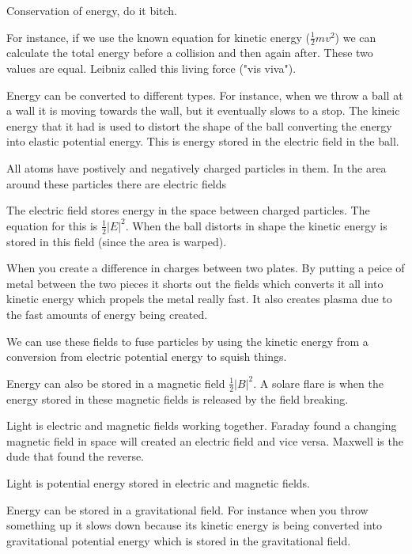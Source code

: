 \documentclass{article}
\begin{document}

Conservation of energy, do it bitch.


For instance, if we use the known equation for kinetic energy ($\frac{1}{2}mv^2$) we can calculate the total energy before a collision and then again after. These two values are equal. Leibniz called this living force ("vis viva").


Energy can be converted to different types. For instance, when we throw a ball at a wall it is moving towards the wall, but it eventually slows to a stop. The kineic energy that it had is used to distort the shape of the ball converting the energy into elastic potential energy. This is energy stored in the electric field in the ball.


All atoms have postively and negatively charged particles in them. In the area around these particles there are electric fields


The electric field stores energy in the space between charged particles. The equation for this is $\frac{1}{2}|E|^2$. When the ball distorts in shape the kinetic energy is stored in this field (since the area is warped).


When you create a difference in charges between two plates. By putting a peice of metal between the two pieces it shorts out the fields which converts it all into kinetic energy which propels the metal really fast. It also creates plasma due to the fast amounts of energy being created.



We can use these fields to fuse particles by using the kinetic energy from a conversion from electric potential energy to squish things.


Energy can also be stored in a magnetic field $\frac{1}{2}|B|^2$. A solare flare is when the energy stored in these magnetic fields is released by the field breaking.


Light is electric and magnetic fields working together. Faraday found a changing magnetic field in space will created an electric field and vice versa. Maxwell is the dude that found the reverse.


Light is potential energy stored in electric and magnetic fields.


Energy can be stored in a gravitational field. For instance when you throw something up it slows down because its kinetic energy is being converted into gravitational potential energy which is stored in the gravitational field.
\end{document}
